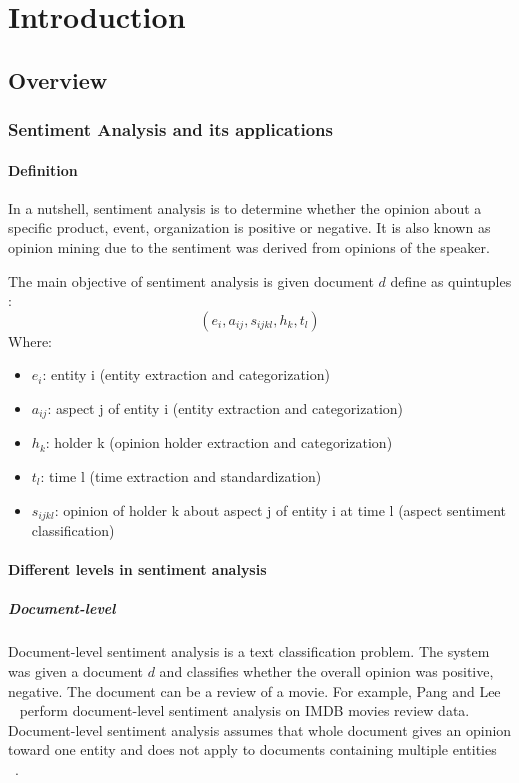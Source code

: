 \hypertarget{chap:intro}{\chapter{Introduction}}
\section{Overview}
\subsection{Sentiment Analysis and its applications}
\subsubsection{Definition}
In a nutshell, sentiment analysis is to determine whether the opinion about a specific product, event, organization is positive or negative. It is also known as opinion mining due to the sentiment was derived from opinions of the speaker.

The main objective of sentiment analysis is given document $d$ define as quintuples \cite{liu2012sentiment}:
\[ ( e_{i}, a_{ij}, s_{ijkl}, h_{k}, t_{l} ) \]
 Where:
\begin{itemize}
	\item $e_{i}$: entity i (entity extraction and categorization)
	\item $a_{ij}$: aspect j of entity i (entity extraction and categorization)
	\item $h_{k}$: holder k (opinion holder extraction and categorization)
	\item $t_{l}$: time l (time extraction and standardization)
	\item $s_{ijkl}$: opinion of holder k about aspect j of entity i at time l (aspect sentiment classification)
\end{itemize}


\subsubsection{Different levels in sentiment analysis}
\paragraph{Document-level}
Document-level sentiment analysis is a text classification problem. The system was given a document $d$ and classifies whether the overall opinion was positive, negative. The document can be a review of a movie. For example, Pang and Lee ~\cite{pang2002thumbs} perform document-level sentiment analysis on IMDB movies review data. Document-level sentiment analysis assumes that whole document gives an opinion toward one entity and does not apply to documents containing multiple entities ~\cite{liu2012sentiment}.

